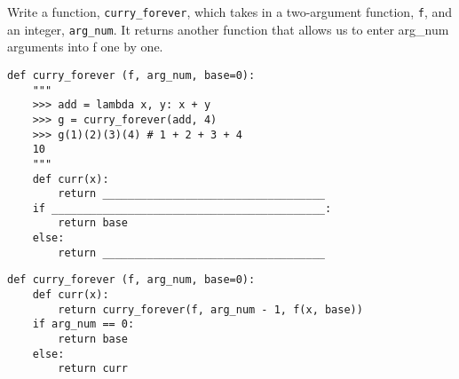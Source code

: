 \begin{blocksection}
\question Write a function, \texttt{curry\_forever}, which takes in a two-argument function, \texttt{f}, and an integer, \texttt{arg\_num}. It returns another function that allows us to enter arg\_num arguments into f one by one.

\begin{lstlisting}
def curry_forever (f, arg_num, base=0):
    """
    >>> add = lambda x, y: x + y
    >>> g = curry_forever(add, 4)
    >>> g(1)(2)(3)(4) # 1 + 2 + 3 + 4
    10 
    """
    def curr(x):
        return ___________________________________
    if ___________________________________________:
        return base
    else:
        return ___________________________________
\end{lstlisting}

\begin{solution}
\begin{lstlisting}
def curry_forever (f, arg_num, base=0):
    def curr(x):
        return curry_forever(f, arg_num - 1, f(x, base))
    if arg_num == 0:
        return base
    else:
        return curr

\end{lstlisting}
\end{solution}
\end{blocksection}

